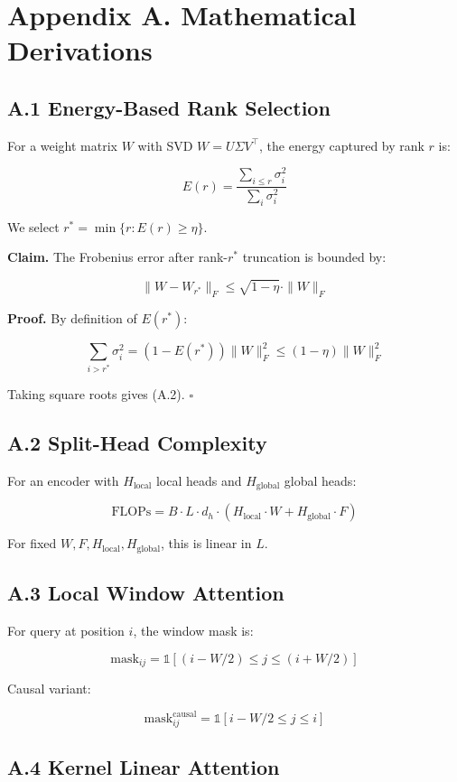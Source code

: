 \section{Appendix A. Mathematical Derivations}

\subsection{A.1 Energy-Based Rank Selection}

For a weight matrix $W$ with SVD $W = U \Sigma V^\top$, the energy captured 
by rank $r$ is:

\[
E(r) = \frac{\sum_{i \leq r} \sigma_i^2}{\sum_{i} \sigma_i^2}
\]

We select $r^* = \min \{ r : E(r) \geq \eta \}$.

\textbf{Claim.} The Frobenius error after rank-$r^*$ truncation is bounded by:

\[
\|W - W_{r^*}\|_F \leq \sqrt{1 - \eta} \cdot \|W\|_F
\]

\textbf{Proof.} By definition of $E(r^*)$:

\[
\sum_{i > r^*} \sigma_i^2 = (1 - E(r^*)) \|W\|_F^2 \leq (1 - \eta) \|W\|_F^2
\]

Taking square roots gives (A.2). $\square$

\subsection{A.2 Split-Head Complexity}

For an encoder with $H_\text{local}$ local heads and $H_\text{global}$ 
global heads:

\[
\text{FLOPs} = B \cdot L \cdot d_h \cdot (H_\text{local} \cdot W + H_\text{global} \cdot F)
\]

For fixed $W, F, H_\text{local}, H_\text{global}$, this is linear in $L$.

\subsection{A.3 Local Window Attention}

For query at position $i$, the window mask is:

\[
\text{mask}_{ij} = \mathbb{1}[(i - W/2) \leq j \leq (i + W/2)]
\]

Causal variant:

\[
\text{mask}_{ij}^\text{causal} = \mathbb{1}[i - W/2 \leq j \leq i]
\]

\subsection{A.4 Kernel Linear Attention}

